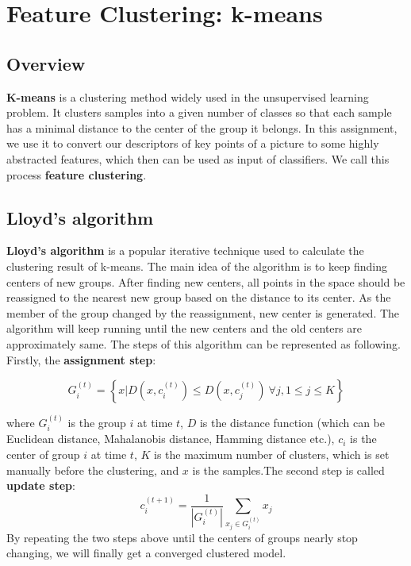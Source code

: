\section{Feature Clustering: k-means}

\subsection{Overview}

\textbf{K-means} is a clustering method widely used in the unsupervised learning problem.
It clusters samples into a given number of classes so that each sample has a minimal distance to the center of the group it belongs.
In this assignment, we use it to convert our descriptors of key points of a picture to some highly abstracted features,
which then can be used as input of classifiers.
We call this process \textbf{feature clustering}.

\subsection{Lloyd's algorithm}
\textbf{Lloyd's algorithm} is a popular iterative technique used to calculate the clustering result of k-means. 
The main idea of the algorithm is to keep finding centers of new groups.
After finding new centers, all points in the space should be reassigned to the nearest new group based on the distance to its center.
As the member of the group changed by the reassignment, new center is generated.
The algorithm will keep running until the new centers and the old centers are approximately same.
The steps of this algorithm can be represented as following. Firstly, the \textbf{assignment step}:

$$
G_i^{(t)} = \left\{ x | D(x, c_i^{(t)}) \leq D(x, c_j^{(t)}) \ \forall j, 1 \leq j \leq K \right\}
$$

where $G_i^{(t)}$ is the group $i$ at time $t$, 
$D$ is the distance function (which can be Euclidean distance, Mahalanobis distance,  Hamming distance etc.),
$c_i$ is the center of group $i$ at time $t$, 
$K$ is the maximum number of clusters, which is set manually before the clustering,
and $x$ is the samples.The second step is called \textbf{update step}: 
$$
c_i^{(t+1)} = \frac{1}{|G_i^{(t)}|} \sum_{x_j \in G_i^{(t)}} x_j
$$
By repeating the two steps above until the centers of groups nearly stop changing, we will finally get a converged clustered model.

